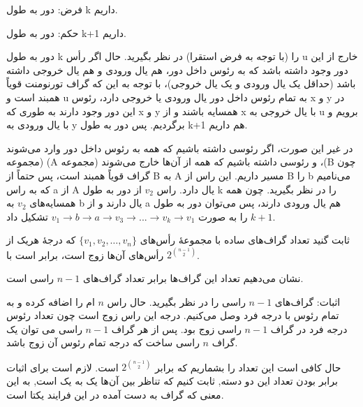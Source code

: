 \documentclass[11pt,largemargins]{h2wp}
\begin{document}
    فرض: دور به طول k داریم.
    
    حکم: دور به طول k+1 داریم.
    
    دور به طول k را (با توجه به فرض استقرا) در نظر بگیرید. حال اگر رأس u خارج از این دور وجود داشته باشد که به رئوس داخل دور، هم یال ورودی و هم یال خروجی داشته باشد (حداقل یک یال ورودی و یک یال خروجی)، با توجه به این که گراف تورنومنت قویاً همبند است و u به تمام رئوس داخل دور یال ورودی یا خروجی دارد، رئوس x و y در این دور وجود دارند به طوری که x و y همسایه باشند و از x با یال خروجی به u برویم و با یال ورودی به y برگردیم. پس دور به طول k+1 هم داریم.
    
    در غیر این صورت، اگر رئوسی داشته باشیم که همه به رئوس داخل دور وارد می‌شوند (مجموعه (A و رئوسی داشته باشیم که همه از آن‌ها خارج می‌شوند (مجموعه ،(B چون گراف قویاً همبند است، پس حتماً از B به  A مسیر داریم. این راس از B را b می‌نامیم که به راس a از A یال دارد. راس $v_2 $ از دور به طول k را در نظر بگیرید. چون همه همسایه‌های $v_2 $ به b یال دارند و از a هم یال ورودی دارند، پس می‌توان دور به طول $ k +1 $ را به صورت 
    $ v_1 \rightarrow b \rightarrow a \rightarrow v_3 \rightarrow ... \rightarrow v_k \rightarrow v_1 $
    تشکیل داد.
   
    
   
   


    \question

    ثابت گنید تعداد گراف‌های ساده با مجموعهٔ رأس‌های $\{v_{1}, v_{2}, \dots, v_{n}\}$  که درجهٔ هریک از رأس‌های آن‌ها زوج است، برابر است با $2^{{n-1}\choose{2}}$.
   
\solution
 نشان می‌دهیم تعداد این گراف‌ها برابر تعداد گراف‌های 
$n-1$ 
 راسی است.
 
 اثبات: گراف‌های 
 $n-1$ 
 راسی را در نظر بگیرید. حال راس 
 $n$ 
 ام را اضافه کرده و به تمام رئوس با درجه فرد وصل می‌کنیم.
 درجه این راس زوج است چون تعداد رئوس درجه فرد در گراف 
 $n-1$ 
 راسی زوج بود.
 پس از هر گراف 
 $n-1$ 
 راسی می توان یک گراف 
 $n$ 
 راسی ساخت که درجه تمام رئوس آن زوج باشد.
 
 حال کافی است این تعداد را بشماریم که برابر
 $2^{{n-1}\choose{2}}$
 است.
  لازم است برای اثبات برابر بودن تعداد این دو دسته, ثابت کنیم که تناظر بین آن‌ها یک به یک است, به این معنی که گراف به دست آمده در این فرایند یکتا است.
 
\end{document}
